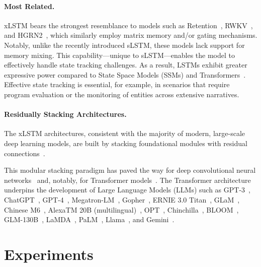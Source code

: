 \paragraph{Most Related.} xLSTM bears the strongest resemblance to models such as Retention~\citep{Sun:23arxiv}, RWKV~\citep{Peng:23arxivshort,Peng:24arxivshort}, and HGRN2~\citep{Qin:24arxiv}, which similarly employ matrix memory and/or gating mechanisms. Notably, unlike the recently introduced sLSTM, these models lack support for memory mixing. This capability—unique to sLSTM—enables the model to effectively handle state tracking challenges. As a result, LSTMs exhibit greater expressive power compared to State Space Models (SSMs) and Transformers~\citep{Merrill:24,Deletang:23}. Effective state tracking is essential, for example, in scenarios that require program evaluation or the monitoring of entities across extensive narratives.

\paragraph{Residually Stacking Architectures.} The xLSTM architectures, consistent with the majority of modern, large-scale deep learning models, are built by stacking foundational modules with residual connections~\citep{Srivastava:15,He:16}.

This modular stacking paradigm has paved the way for deep convolutional neural networks~\citep{He:16} and, notably, for Transformer models~\citep{Vaswani:17}. The Transformer architecture underpins the development of Large Language Models (LLMs) such as GPT-3~\citep{Brown:20short}, ChatGPT~\citep{Schulman:22short}, GPT-4~\citep{Achiam:23gpt4short}, Megatron-LM~\citep{Shoeybi:19}, Gopher~\citep{Rae:21short}, ERNIE 3.0 Titan~\citep{Wang:21arxivshort}, GLaM~\citep{Du:21glamshort}, Chinese M6~\citep{Lin:21}, AlexaTM 20B (multilingual)~\citep{Soltan:22}, OPT~\citep{Zhang:22opt}, Chinchilla~\citep{Hoffmann:22short}, BLOOM~\citep{Scao:22arxivshort}, GLM-130B~\citep{Zeng:22arxivshort}, LaMDA~\citep{Thoppilan:22short}, PaLM~\citep{Chowdhery:22short}, Llama~\citep{Touvron:23arxiv}, and Gemini~\citep{GeminiTeam:23arxiv,Reid:24arxiv}.

\section{Experiments}
\label{sec:Exp}


